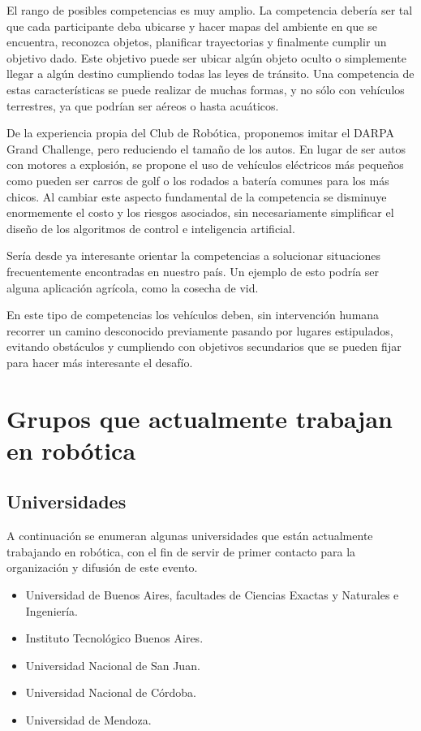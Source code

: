 \documentclass[a4paper,12pt]{article}
\begin{document}
El rango de posibles competencias es muy amplio. La competencia debería ser tal que cada participante deba ubicarse y hacer mapas del ambiente en que se encuentra, reconozca objetos, planificar trayectorias y finalmente cumplir un objetivo dado. Este objetivo puede ser ubicar algún objeto oculto o simplemente llegar a algún destino cumpliendo todas las leyes de tránsito. Una competencia de estas características se puede realizar de muchas formas, y no sólo con vehículos terrestres, ya que podrían ser aéreos o hasta acuáticos\cite{auvsi}.

De la experiencia propia del Club de Robótica\cite{club}, proponemos imitar el DARPA Grand Challenge, pero reduciendo el tamaño de los autos. En lugar de ser autos con motores a explosión, se propone el uso de vehículos eléctricos más pequeños como pueden ser carros de golf o los rodados a batería comunes para los más chicos. Al cambiar este aspecto fundamental de la competencia se disminuye enormemente el costo y los riesgos asociados, sin necesariamente simplificar el diseño de los algoritmos de control e inteligencia artificial.

Sería desde ya interesante orientar la competencias a solucionar situaciones frecuentemente encontradas en nuestro país. Un ejemplo de esto podría ser alguna aplicación agrícola, como la cosecha de vid\cite{wall-ye}.

En este tipo de competencias los vehículos deben, sin intervención humana recorrer un camino desconocido previamente pasando por lugares estipulados, evitando obstáculos y cumpliendo con objetivos secundarios que se pueden fijar para hacer más interesante el desafío.

\section{Grupos que actualmente trabajan en robótica}
\label{sec:grupos}

\subsection{Universidades}

A continuación se enumeran algunas universidades que están actualmente trabajando en robótica, con el fin de servir de primer contacto para la organización y difusión de este evento.

\begin{itemize}
 \item Universidad de Buenos Aires, facultades de Ciencias Exactas y Naturales e Ingeniería.
 \item Instituto Tecnológico Buenos Aires.
 \item Universidad Nacional de San Juan.
 \item Universidad Nacional de Córdoba.
 \item Universidad de Mendoza.
\end{itemize}
\end{document}
